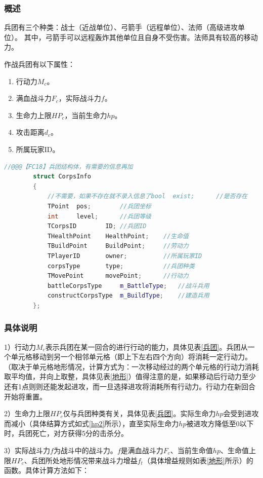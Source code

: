 \documentclass[a4paper,4pt]{article}
\begin{document}
\subsubsection{概述}
兵团有三个种类：战士（近战单位）、弓箭手（远程单位）、法师（高级进攻单位）。
其中，弓箭手可以远程轰炸其他单位且自身不受伤害。法师具有较高的移动力。\par
作战兵团有以下属性：
\begin{enumerate}[fullwidth, itemindent=2em, label=(\arabic*)]
	\item 行动力$M_c$。
	\item 满血战斗力$F_c$，实际战斗力$f$。
	\item 生命力上限$HP_c$，当前生命力$hp$。
	\item 攻击距离$d_c$。%
	\item 所属玩家ID。
\end{enumerate}
\begin{lstlisting}[language={C++},title={防御塔结构体}]  %插入代码块
		//@@@【FC18】兵团结构体，有需要的信息再加
		struct CorpsInfo
		{
			//不需要，如果不存在就不录入信息了bool	exist;		//是否存在
			TPoint	pos;		//兵团坐标
			int		level;		//兵团等级
			TCorpsID		ID;	//兵团ID
			THealthPoint	HealthPoint;	//生命值
			TBuildPoint		BuildPoint;		//劳动力
			TPlayerID		owner;			//所属玩家ID
			corpsType       type;           //兵团种类
			TMovePoint      movePoint;      //行动力
			battleCorpsType		m_BattleType;	//战斗兵用
			constructCorpsType	m_BuildType;	//建造兵用
		};
	\end{lstlisting}
\subsubsection{具体说明}
1）行动力$M_c$表示兵团在某一回合的进行行动的能力，具体见表\ref{兵团}。兵团从一个单元格移动到另一个相邻单元格（即上下左右四个方向）将消耗一定行动力。（取决于单元格地形情况，计算方式为：一次移动经过的两个单元格的行动力消耗取平均值，并向上取整，具体见表\ref{地形}）值得注意的是，如果移动后行动力至少还有1点则则还能发起进攻，而一旦选择进攻将消耗所有行动力。行动力在新回合开始将重置。\par
2）生命力上限$HP_c$仅与兵团种类有关，具体见表\ref{兵团}。实际生命力$hp$会受到进攻而减小（具体结算方式如式\ref{hp2}所示），直至实际生命力$hp$被进攻方降低至0以下时，兵团死亡，对方获得5分的击杀分。\par
3）实际战斗力$f$为战斗中的战斗力。$f$是满血战斗力$F_c$、当前生命值$hp$、生命值上限$HP_c$、兵团所处地形情况带来战斗力增益$f_t$（具体增益规则如表\ref{地形}所示）的函数。具体计算方法如下：
\end{document}
